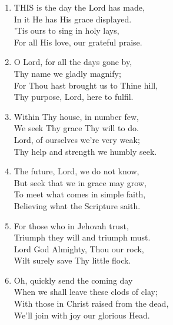 \begin{enumerate}
    \item THIS is the day the Lord has made, \\
        In it He has His grace displayed. \\
        'Tis ours to sing in holy lays, \\
        For all His love, our grateful praise.

    \item O Lord, for all the days gone by, \\
        Thy name we gladly magnify; \\
        For Thou hast brought us to Thine hill, \\
        Thy purpose, Lord, here to fulfil.

    \item Within Thy house, in number few, \\
        We seek Thy grace Thy will to do. \\
        Lord, of ourselves we're very weak; \\
        Thy help and strength we humbly seek.

    \item The future, Lord, we do not know, \\
        But seek that we in grace may grow, \\
        To meet what comes in simple faith, \\
        Believing what the Scripture saith.

    \item For those who in Jehovah trust, \\
        Triumph they will and triumph must. \\
        Lord God Almighty, Thou our rock, \\
        Wilt surely save Thy little flock.

    \item Oh, quickly send the coming day \\
        When we shall leave these clods of clay; \\
        With those in Christ raised from the dead, \\
        We'll join with joy our glorious Head.

\end{enumerate}
